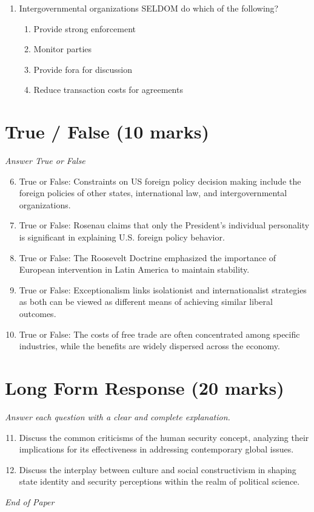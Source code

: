 \documentclass[12pt]{article}
\begin{document}
\begin{enumerate}[label=\arabic*.]
\begin{enumerate}[label=(\alph*)]
    \item Telecommunication networks
\end{enumerate}
\item Intergovernmental organizations SELDOM do which of the following?
\begin{enumerate}[label=(\alph*)]
    \item Provide strong enforcement
    \item Monitor parties
    \item Provide fora for discussion
    \item Reduce transaction costs for agreements
\end{enumerate}
\end{enumerate}

\section*{True / False (10 marks)}
\textit{Answer True or False}
\begin{enumerate}[label=\arabic*.]
\setcounter{enumi}{5}
\item True or False: Constraints on US foreign policy decision making include the foreign policies of other states, international law, and intergovernmental organizations.
\item True or False: Rosenau claims that only the President's individual personality is significant in explaining U.S. foreign policy behavior.
\item True or False: The Roosevelt Doctrine emphasized the importance of European intervention in Latin America to maintain stability.
\item True or False: Exceptionalism links isolationist and internationalist strategies as both can be viewed as different means of achieving similar liberal outcomes.
\item True or False: The costs of free trade are often concentrated among specific industries, while the benefits are widely dispersed across the economy.
\end{enumerate}

\section*{Long Form Response (20 marks)}
\textit{Answer each question with a clear and complete explanation.}
\begin{enumerate}[label=\arabic*.]
\setcounter{enumi}{10}
\item Discuss the common criticisms of the human security concept, analyzing their implications for its effectiveness in addressing contemporary global issues.
\item Discuss the interplay between culture and social constructivism in shaping state identity and security perceptions within the realm of political science.
\end{enumerate}

\vfill
\noindent\textit{End of Paper}
\end{document}

